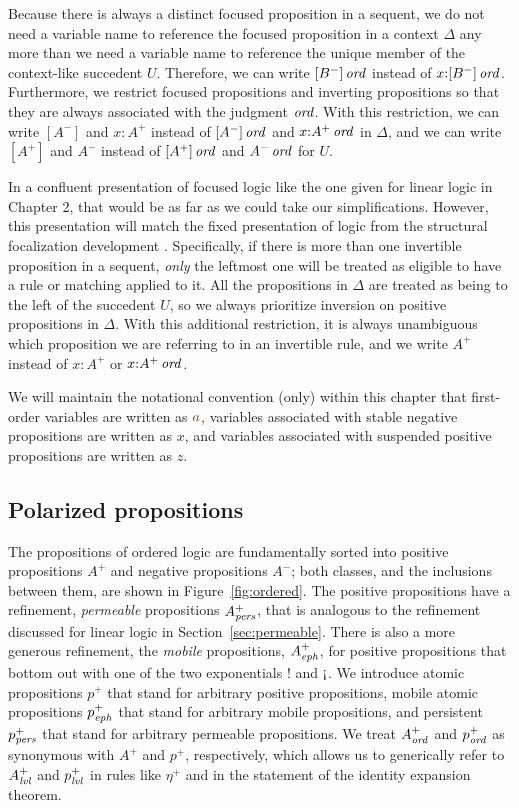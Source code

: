 Because there is always a distinct focused proposition in a sequent,
we do not need a variable name to reference the focused proposition in
a context $\Delta$ any more than we need a variable name to reference
the unique member of the context-like succedent $U$. Therefore, we
can write ${[B^-]}\,{{\it ord}}$ instead of $x{:}{[B^-]}\,{{\it ord}}$. Furthermore,
we restrict focused propositions and inverting propositions so that
they are always associated with the judgment ${\it ord}$. With this
restriction, we can write $[A^-]$ and $x{:}A^+$ instead of
${[A^-]}\,{{\it ord}}$ and $x{:}{A^+}\,{{\it ord}}$ in $\Delta$, and we can write
$[A^+]$ and $A^-$ instead of ${[A^+]}\,{{\it ord}}$ and ${A^-}\,{{\it ord}}$ for
$U$.

In a confluent presentation of focused logic like the one given for
linear logic in Chapter 2, that would be as far as we could take our
simplifications. However, this presentation will match the fixed
presentation of logic from the structural focalization development
\cite{simmons11structural}. Specifically, if there is more than one
invertible proposition in a sequent, {\it only} the leftmost one will
be treated as eligible to have a rule or matching applied to it. All the
propositions in $\Delta$ are treated as being to the left of the
succedent $U$, so we always prioritize inversion on positive
propositions in $\Delta$. With this additional restriction, it is
always unambiguous which proposition we are referring to in an
invertible rule, and we write $A^+$ instead of $x{:}A^+$ or
$x{:}{A^+}\,{{\it ord}}$.

We will maintain the notational convention (only) within this chapter that
first-order variables are written as $\lf{a}$, variables associated
with stable negative propositions are written as $x$, and variables
associated with suspended positive propositions are written as 
$z$.

\subsection{Polarized propositions}
\label{sec:ordpolarprop}

The propositions of ordered logic are fundamentally sorted into
positive propositions $A^+$ and negative propositions $A^-$; both
classes, and the inclusions between them, 
are shown in Figure~\ref{fig:ordered}. The
positive propositions have a refinement, {\it permeable} propositions
$A^+_{\it pers}$, that is analogous to the refinement discussed for linear
logic in Section~\ref{sec:permeable}. There is also a more generous
refinement, the {\it mobile} propositions, $A^+_{\it eph}$, for positive
propositions that bottom out with one of the two exponentials ${!}$ and
${\gnab}$. We introduce atomic propositions $p^+$ that stand for
arbitrary positive propositions, mobile
atomic propositions $p^+_{\it eph}$ that stand for arbitrary
mobile propositions, and persistent $p^+_{\it pers}$ that stand for arbitrary
permeable propositions. We treat $A^+_{\it ord}$ and $p^+_{\it ord}$ as synonymous
with $A^+$ and $p^+$, respectively, which allows us to generically
refer to $A^+_{\it lvl}$ and $p^+_{\it lvl}$ in rules like $\eta^+$ and in the
statement of the identity expansion theorem.

